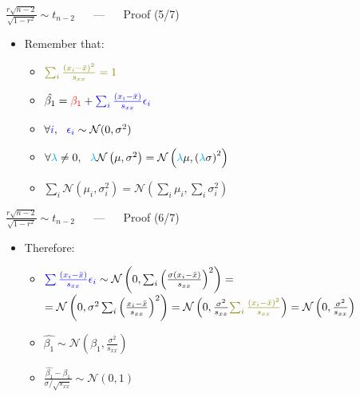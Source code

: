 \documentclass{beamer}
\begin{document}
\begin{frame}
{\centerline{$  \frac{r\sqrt{n-2}}{\sqrt{1-r^2}} \sim t_{n-2} $  ~~ --- ~~ Proof (5/7)}}

\begin{itemize}
\item Remember that:
\begin{itemize}
\item $ \textcolor{olive}{ \sum_i \frac{ \left ( x_i - \bar{x} \right)^2}{s_{xx}} = 1}$
\item $\hat{\beta_1} = \textcolor{red}{\beta_1} + \textcolor{blue}{\sum_i \frac{(x_i - \bar{x})}{s_{xx}} \epsilon_i}$
\item $ \forall \textcolor{blue}{i}, ~~ \textcolor{blue}{\epsilon_i} \sim \mathcal{N}(0, \sigma^2)$
\item $ \forall \textcolor{cyan}{\lambda}  \neq 0, ~~ \textcolor{cyan}{\lambda} \mathcal{N}\left ( \mu,\sigma^{2} \right )  = \mathcal{N}\left ( \textcolor{cyan}{\lambda}  \mu,\left (\textcolor{cyan}{\lambda}  \sigma\right )^{2} \right )$
\item $\sum_i \mathcal{N}\left ( \mu_i,\sigma^{2}_i \right ) = \mathcal{N}\left ( \sum_i \mu_i , \sum_i \sigma^{2}_i \right )$
\end{itemize}
\end{itemize}
\end{frame}

\begin{frame}
{\centerline{$  \frac{r\sqrt{n-2}}{\sqrt{1-r^2}} \sim t_{n-2} $  ~~ --- ~~ Proof (6/7)}}

\begin{itemize}
\item Therefore:
\begin{itemize}
\item  $\textcolor{blue}{\sum \frac{(x_i - \bar{x})}{s_{xx}} \epsilon_i} \sim  \mathcal{N} \left (0,  \sum_i \left ( \frac{\sigma (x_i - \bar{x})}{s_{xx}} \right )^2 \right ) = $
$ =  \mathcal{N} \left (0,  \sigma^2 \sum_i \left ( \frac{ x_i - \bar{x} }{s_{xx}} \right )^2 \right )  = \mathcal{N} \left (0, \frac{\sigma^2}{s_{xx}} \textcolor{olive}{\sum_i \frac{\left ( x_i - \bar{x} \right)^2}{s_{xx}}} \right ) = \mathcal{N} \left ( 0, \frac{\sigma^2}{s_{xx}} \right )$

\item $\hat{\beta_1} \sim \mathcal{N}  \left ( \beta_1, \frac{\sigma^2}{s_{xx}} \right )$
\item $\frac{\hat{\beta_1} - \beta_1}{\sigma / \sqrt{s_{xx}}} \sim \mathcal{N} \left ( 0, 1 \right ) $
\end{itemize}
\end{itemize}




\end{frame}
\end{document}
